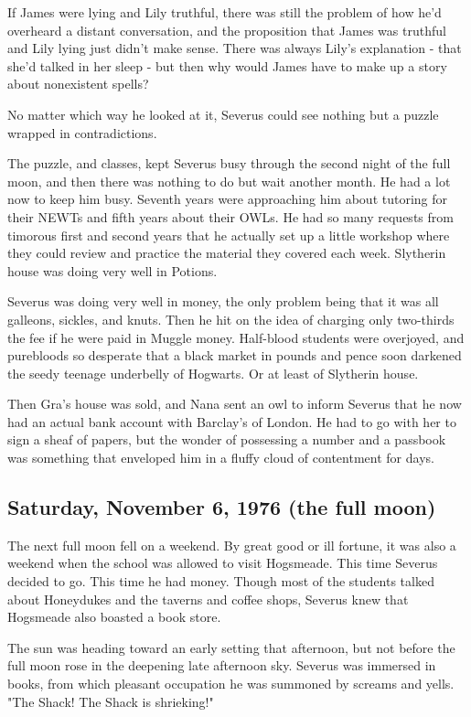 If James were lying and Lily truthful, there was still the problem of how he'd overheard a distant conversation, and the proposition that James was truthful and Lily lying just didn't make sense. There was always Lily's explanation - that she'd talked in her sleep - but then why would James have to make up a story about nonexistent spells?

No matter which way he looked at it, Severus could see nothing but a puzzle wrapped in contradictions.

The puzzle, and classes, kept Severus busy through the second night of the full moon, and then there was nothing to do but wait another month. He had a lot now to keep him busy. Seventh years were approaching him about tutoring for their NEWTs and fifth years about their OWLs. He had so many requests from timorous first and second years that he actually set up a little workshop where they could review and practice the material they covered each week. Slytherin house was doing very well in Potions.

Severus was doing very well in money, the only problem being that it was all galleons, sickles, and knuts. Then he hit on the idea of charging only two-thirds the fee if he were paid in Muggle money. Half-blood students were overjoyed, and purebloods so desperate that a black market in pounds and pence soon darkened the seedy teenage underbelly of Hogwarts. Or at least of Slytherin house.

Then Gra's house was sold, and Nana sent an owl to inform Severus that he now had an actual bank account with Barclay's of London. He had to go with her to sign a sheaf of papers, but the wonder of possessing a number and a passbook was something that enveloped him in a fluffy cloud of contentment for days.

\subsection{Saturday, November 6, 1976 (the full moon)}

The next full moon fell on a weekend. By great good or ill fortune, it was also a weekend when the school was allowed to visit Hogsmeade. This time Severus decided to go. This time he had money. Though most of the students talked about Honeydukes and the taverns and coffee shops, Severus knew that Hogsmeade also boasted a book store.

The sun was heading toward an early setting that afternoon, but not before the full moon rose in the deepening late afternoon sky. Severus was immersed in books, from which pleasant occupation he was summoned by screams and yells. "The Shack! The Shack is shrieking!"

